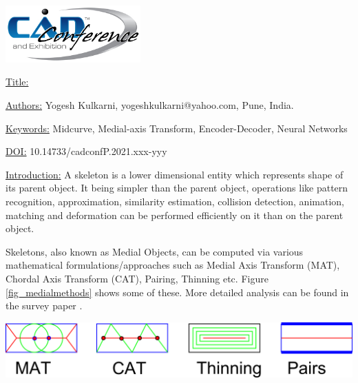 \documentclass{article}
\begin{document}
{\centering  \includegraphics[width=5.173cm,height=2.193cm]{images/CADconverted-img001.jpg} \par}

\vspace{5pt}
\noindent
\underline{Title:}


\vspace{1em}
\noindent \underline{Authors:}
\newline
Yogesh Kulkarni, yogeshkulkarni@yahoo.com, Pune, India.

\vspace{1em}
\noindent \underline{Keywords:}\newline
Midcurve, Medial-axis Transform, Encoder-Decoder, Neural Networks


\bigskip


\noindent \underline{DOI:} 10.14733/cadconfP.2021.xxx-yyy

\vspace{10pt}
\noindent\underline{Introduction:}\vspace{0.2em}\newline
A skeleton is a lower dimensional entity which represents shape of its parent object. It being simpler than the parent object, operations like pattern recognition, approximation, similarity estimation, collision detection, animation, matching and deformation can be performed efficiently on it than on the parent object. 

Skeletons, also known as Medial Objects, can be computed via various mathematical formulations/approaches such as Medial Axis Transform (MAT), Chordal Axis Transform (CAT), Pairing, Thinning etc. Figure \ref{fig_medialmethods} shows some of these. More detailed analysis can be found in the survey paper \cite{medial2010}.

    \begin{center}
	\includegraphics[width=0.6\linewidth]{images/MedialMethodsOnlyShort}
	\label{fig_medialmethods}
    \end{center}
    
\end{document}
